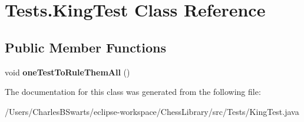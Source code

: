 \hypertarget{class_tests_1_1_king_test}{}\section{Tests.\+King\+Test Class Reference}
\label{class_tests_1_1_king_test}
\subsection*{Public Member Functions}
\begin{DoxyCompactItemize}
\item 
\mbox{\label{class_tests_1_1_king_test_aef386a444d2f1c46dd4559e303633a16}} 
void {\bfseries one\+Test\+To\+Rule\+Them\+All} ()
\end{DoxyCompactItemize}


The documentation for this class was generated from the following file\+:\begin{DoxyCompactItemize}
\item 
/\+Users/\+Charles\+B\+Swarts/eclipse-\/workspace/\+Chess\+Library/src/\+Tests/King\+Test.\+java\end{DoxyCompactItemize}

